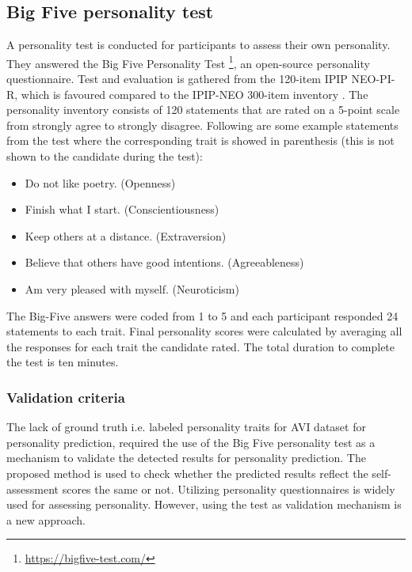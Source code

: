 %
\begin{table}[h]
\caption{AVI dataset statistics.}
\centering
{}
\label{tab:new_dataset}
\end{table}

\subsection{Big Five personality test}
A personality test is conducted for participants to assess their own personality. They answered the Big Five Personality Test \footnote{\url{https://bigfive-test.com/}}, an open-source personality questionnaire. Test and evaluation is gathered from the 120-item IPIP NEO-PI-R, which is favoured compared to the IPIP-NEO 300-item inventory \cite{JOHNSON201478}. The personality inventory consists of 120 statements that are rated on a 5-point scale from strongly agree to strongly disagree. Following are some example statements from the test where the corresponding trait is showed in parenthesis (this is not shown to the candidate during the test):
%
\begin{itemize}
    \item Do not like poetry. (Openness)
    \item Finish what I start. (Conscientiousness)
    \item Keep others at a distance. (Extraversion)
    \item Believe that others have good intentions. (Agreeableness)
    \item Am very pleased with myself. (Neuroticism)
\end{itemize}
%
The Big-Five answers were coded from 1 to 5 and each participant responded 24 statements to each trait. Final personality scores were calculated by averaging all the responses for each trait the candidate rated. The total duration to complete the test is ten minutes. 

\subsubsection{Validation criteria}
The lack of ground truth i.e. labeled personality traits for AVI dataset for personality prediction, required the use of the Big Five personality test as a mechanism to validate the detected results for personality prediction. The proposed method is used to check whether the predicted results reflect the self-assessment scores the same or not. Utilizing personality questionnaires is widely used for assessing personality. However, using the test as validation mechanism is a new approach. 

